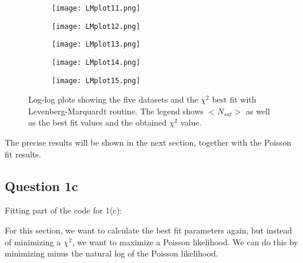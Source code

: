 \begin{figure}[ht!]
\begin{center}
        \begin{subfigure}{.49\textwidth}
      \centering
      \texttt{[image: LMplot11.png]}
    \end{subfigure}
    \vspace{-10pt}
    \begin{subfigure}{.49\textwidth}
      \centering
      \texttt{[image: LMplot12.png]} 
    \end{subfigure}
     \vspace{-10pt}
    \begin{subfigure}{.49\textwidth}
      \centering
      \texttt{[image: LMplot13.png]} 
    \end{subfigure}
     \vspace{-10pt}
    \begin{subfigure}{.49\textwidth}
      \centering
      \texttt{[image: LMplot14.png]} 
    \end{subfigure}
     \vspace{-10pt}
    \begin{subfigure}{.49\textwidth}
      \centering
      \texttt{[image: LMplot15.png]} 
    \end{subfigure}
    \caption{Log-log plots showing the five datasets and the $\chi^2$ best fit with Levenberg-Marquardt routine. The legend shows $<N_{sat}>$ as well as the best fit values and the obtained $\chi^2$ value.}
    \label{fig:LMfit}
\end{center}
\end{figure}

The precise results will be shown in the next section, together with the Poisson fit results.

\subsection{Question 1c}

Fitting part of the code for 1(c):


For this section, we want to calculate the best fit parameters again, but instead of minimizing a $\chi^2$, we want to maximize a Poisson likelihood.
We can do this by minimizing minus the natural log of the Poisson likelihood.

